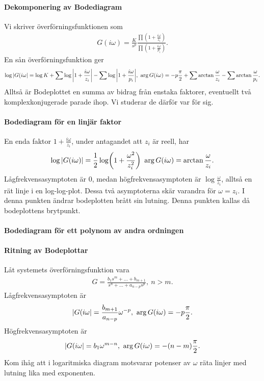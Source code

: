 \paragraph{Dekomponering av Bodediagram}
Vi skriver överförningsfunktionen som
\begin{align*}
	G(i\omega) = \frac{K}{s^{p}}\frac{\prod\left(1 +\frac{i\omega}{z_{i}}\right)}{\prod\left(1 +\frac{i\omega}{p_{i}}\right)}.
\end{align*}
En sån överförningsfunktion ger
\begin{align*}
	\log{\abs{G(i\omega}} = \log{K} + \sum\log{\abs{1 +\frac{i\omega}{z_{i}}}} - \sum\log{\abs{1 +\frac{i\omega}{p_{i}}}},\ \arg{G(i\omega)} = -p\frac{\pi}{2} + \sum\arctan{\frac{\omega}{z_{i}}} - \sum\arctan{\frac{\omega}{p_{i}}}.
\end{align*}
Alltså är Bodeplottet en summa av bidrag från enstaka faktorer, eventuellt två komplexkonjugerade parade ihop. Vi studerar de därför var för sig.

\paragraph{Bodediagram för en linjär faktor}
En enda faktor $1 +\frac{i\omega}{z_{i}}$, under antagandet att $z_{i}$ är reell, har
\begin{align*}
	\log{\abs{G(i\omega)}} = \frac{1}{2}\log(1 + \frac{\omega^{2}}{z_{i}^{2}})\ \arg{G(i\omega)} = \arctan{\frac{\omega}{z_{i}}}.
\end{align*}
Lågfrekvensasymptoten är $0$, medan högfrekvensasymptoten är $\log{\frac{\omega}{z_{i}}}$, alltså en rät linje i en log-log-plot. Dessa två asymptoterna skär varandra för $\omega = z_{i}$. I denna punkten ändrar bodeplotten brått sin lutning. Denna punkten kallas då bodeplottens brytpunkt.

\paragraph{Bodediagram för ett polynom av andra ordningen}

\paragraph{Ritning av Bodeplottar}
Låt systemets överförningsfunktion vara
\begin{align*}
	G = \frac{b_{1}s^{m} + \dots + b_{m + 1}}{s^{n} + \dots + a_{n - p}s^{p}},\ n > m.
\end{align*}
Lågfrekvensasymptoten är
\begin{align*}
	\abs{G(i\omega} = \frac{b_{m + 1}}{a_{n - p}}\omega^{-p},\ \arg{G(i\omega)} = -p\frac{\pi}{2}.
\end{align*}
Högfrekvensasymptoten är
\begin{align*}
	\abs{G(i\omega} = b_{1}\omega^{m - n},\ \arg{G(i\omega)} = -(n - m)\frac{\pi}{2}.
\end{align*}
Kom ihåg att i logaritmiska diagram motsvarar potenser av $\omega$ räta linjer med lutning lika med exponenten.

